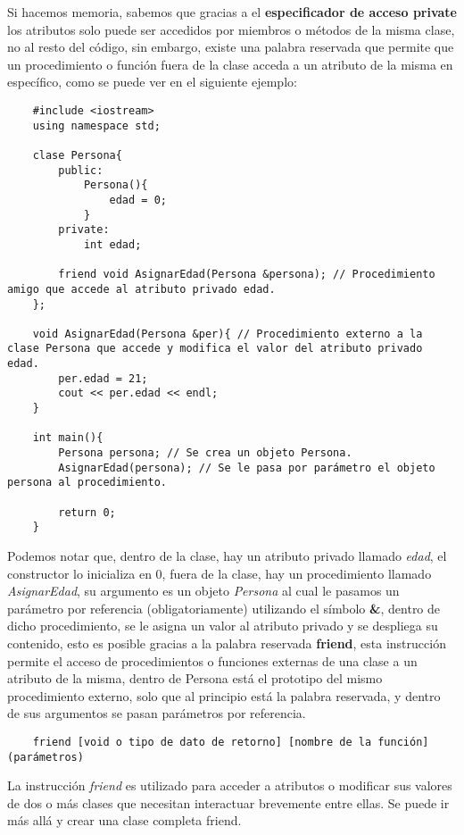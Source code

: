 Si hacemos memoria, sabemos que gracias a el \textbf{especificador de acceso private} los atributos solo puede ser accedidos por miembros o métodos de la misma clase, no al resto del código, sin embargo, existe una palabra reservada que permite que un procedimiento o función fuera de la clase acceda a un atributo de la misma en específico, como se puede ver en el siguiente ejemplo:
\begin{lstlisting}
    #include <iostream>
    using namespace std;

    clase Persona{
        public:
            Persona(){
                edad = 0;
            }
        private:
            int edad;
        
        friend void AsignarEdad(Persona &persona); // Procedimiento amigo que accede al atributo privado edad.
    };
    
    void AsignarEdad(Persona &per){ // Procedimiento externo a la clase Persona que accede y modifica el valor del atributo privado edad.
        per.edad = 21;
        cout << per.edad << endl;
    }
    
    int main(){
        Persona persona; // Se crea un objeto Persona.
        AsignarEdad(persona); // Se le pasa por parámetro el objeto persona al procedimiento.
        
        return 0;
    }
\end{lstlisting}

Podemos notar que, dentro de la clase, hay un atributo privado llamado \textit{edad}, el constructor lo inicializa en 0, fuera de la clase, hay un procedimiento llamado \textit{AsignarEdad}, su argumento es un objeto \textit{Persona} al cual le pasamos un parámetro por referencia (obligatoriamente) utilizando el símbolo \textbf{\&}, dentro de dicho procedimiento, se le asigna un valor al atributo privado y se despliega su contenido, esto es posible gracias a la palabra reservada \textbf{friend}, esta instrucción permite el acceso de procedimientos o funciones externas de una clase a un atributo de la misma, dentro de Persona está el prototipo del mismo procedimiento externo, solo que al principio está la palabra reservada, y dentro de sus argumentos se pasan parámetros por referencia.
\begin{lstlisting}
    friend [void o tipo de dato de retorno] [nombre de la función] (parámetros)
\end{lstlisting}
La instrucción \textit{friend} es utilizado para acceder a atributos o modificar sus valores de dos o más clases que necesitan interactuar brevemente entre ellas. Se puede ir más allá y crear una clase completa friend.


